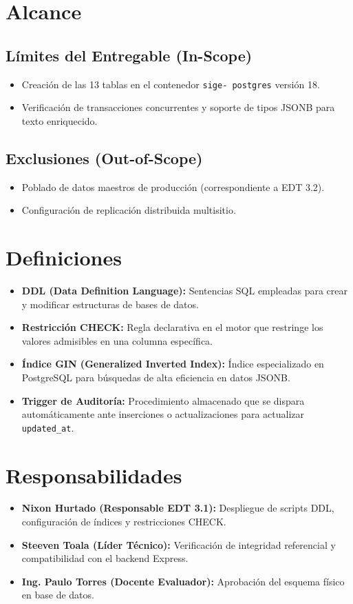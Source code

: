 \documentclass[12pt,a4paper]{article}
\begin{document}
\section{Alcance}
\subsection{Límites del Entregable (In-Scope)}
\begin{itemize}[leftmargin=1.5em, itemsep=2pt]
    \item Creación de las 13 tablas en el contenedor \texttt{sige- postgres} versión 18.
    \item Verificación de transacciones concurrentes y soporte de tipos JSONB para texto enriquecido.
\end{itemize}
\subsection{Exclusiones (Out-of-Scope)}
\begin{itemize}[leftmargin=1.5em, itemsep=2pt]
    \item Poblado de datos maestros de producción (correspondiente a EDT 3.2).
    \item Configuración de replicación distribuida multisitio.
\end{itemize}

\section{Definiciones}
\begin{itemize}[leftmargin=1.5em, itemsep=2pt]
    \item \textbf{DDL (Data Definition Language):} Sentencias SQL empleadas para crear y modificar estructuras de bases de datos.
    \item \textbf{Restricción CHECK:} Regla declarativa en el motor que restringe los valores admisibles en una columna específica.
    \item \textbf{Índice GIN (Generalized Inverted Index):} Índice especializado en PostgreSQL para búsquedas de alta eficiencia en datos JSONB.
    \item \textbf{Trigger de Auditoría:} Procedimiento almacenado que se dispara automáticamente ante inserciones o actualizaciones para actualizar \texttt{updated\_\allowbreak  at}.
\end{itemize}

\section{Responsabilidades}
\begin{itemize}[leftmargin=1.5em, itemsep=2pt]
    \item \textbf{Nixon Hurtado (Responsable EDT 3.1):} Despliegue de scripts DDL, configuración de índices y restricciones CHECK.
    \item \textbf{Steeven Toala (Líder Técnico):} Verificación de integridad referencial y compatibilidad con el backend Express.
    \item \textbf{Ing. Paulo Torres (Docente Evaluador):} Aprobación del esquema físico en base de datos.
\end{itemize}
\end{document}
